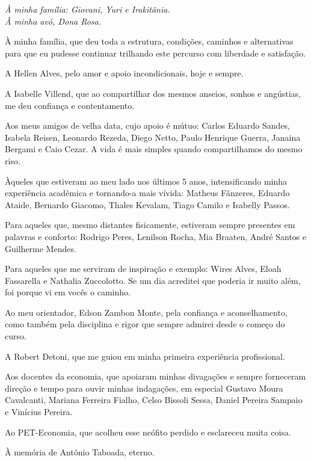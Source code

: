 \documentclass[
  12pt,
  a4paper,
  oneside,
  brazil,
  chapter=TITLE,
  section=TITLE
]{abntex2}
\begin{document}
\begin{dedicatoria}
  \vspace*{\fill}
  \begin{flushright}
    \itshape
    À minha família: Giovani, Yuri e Irakitânia.\\
    À minha avó, Dona Rosa.
  \end{flushright}
\end{dedicatoria}

\begin{agradecimentos}
À minha família, que deu toda a estrutura, condições, caminhos e alternativas para que eu pudesse continuar trilhando este percurso com liberdade e satisfação.

A Hellen Alves, pelo amor e apoio incondicionais, hoje e sempre.

A Isabelle Villend, que ao compartilhar dos mesmos anseios, sonhos e angústias, me deu confiança e contentamento.

Aos meus amigos de velha data, cujo apoio é mútuo: Carlos Eduardo Sandes, Isabela Reisen, Leonardo Rezeda, Diego Netto, Paulo Henrique Guerra, Janaina Bergami e Caio Cezar. A vida é mais simples quando compartilhamos do mesmo riso.

Àqueles que estiveram ao meu lado nos últimos 5 anos, intensificando minha experiência acadêmica e tornando-a mais vívida: Matheus Fânzeres, Eduardo Ataide, Bernardo Giacomo, Thales Kevalam, Tiago Camilo e Isabelly Passos.

Para aqueles que, mesmo distantes fisicamente, estiveram sempre presentes em palavras e conforto: Rodrigo Peres, Lenilson Rocha, Mia Braaten, André Santos e Guilherme Mendes.

Para aqueles que me serviram de inspiração e exemplo: Wires Alves, Eloah Fassarella e Nathalia Zuccolotto. Se um dia acreditei que poderia ir muito além, foi porque vi em vocês o caminho.

Ao meu orientador, Edson Zambon Monte, pela confiança e aconselhamento, como também pela disciplina e rigor que sempre admirei desde o começo do curso.

A Robert Detoni, que me guiou em minha primeira experiência profissional.

Aos docentes da economia, que apoiaram minhas divagações e sempre forneceram direção e tempo para ouvir minhas indagações, em especial Gustavo Moura Cavalcanti, Mariana Ferreira Fialho, Celso Bissoli Sessa, Daniel Pereira Sampaio e Vinícius Pereira.

Ao PET-Economia, que acolheu esse neófito perdido e esclareceu muita coisa.

À memória de Antônio Taboada, eterno.
\end{agradecimentos}
\end{document}
